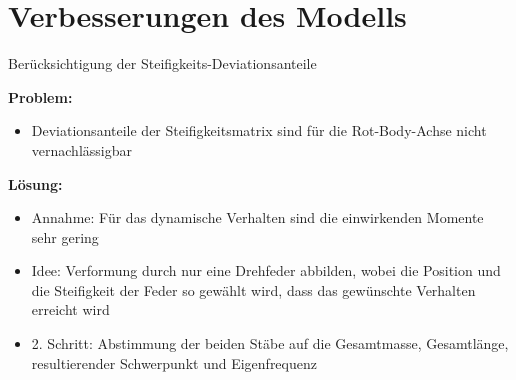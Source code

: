 \documentclass[10pt,xcolor=dvipsnames]{beamer}
\begin{document}
\section{Verbesserungen des Modells}
	\begin{frame}{\small Berücksichtigung der Steifigkeits-Deviationsanteile}
		\begin{minipage}{0.68\textwidth}
			\textbf{Problem:}
			\begin{itemize}
				\item Deviationsanteile der Steifigkeitsmatrix sind für die Rot-Body-Achse nicht vernachlässigbar
			\end{itemize}
			\textbf{Lösung:}
			\begin{itemize}
				\item Annahme: Für das dynamische Verhalten sind die einwirkenden Momente sehr gering
				\item Idee: Verformung durch nur eine Drehfeder abbilden, wobei die Position und die Steifigkeit der Feder so gewählt wird, dass das gewünschte Verhalten erreicht wird  
				\item 2. Schritt: Abstimmung der beiden Stäbe auf die Gesamtmasse, Gesamtlänge, resultierender Schwerpunkt und Eigenfrequenz 
			\end{itemize}
		\end{minipage}
		\hfill
		\begin{minipage}{0.3\textwidth}
			\begin{figure}

\end{figure}
\end{minipage}
\end{frame}
\end{document}
